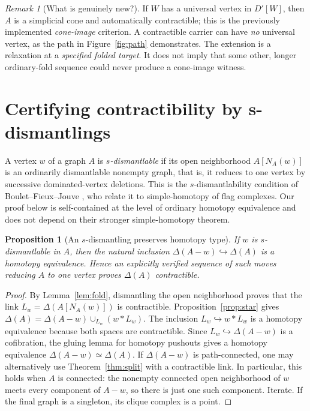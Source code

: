 \documentclass[11pt,letterpaper]{article}
\newtheorem{proposition}[theorem]{Proposition}
\theoremstyle{definition}
\theoremstyle{remark}
\newtheorem{remark}[theorem]{Remark}
\newcommand{\Del}{\Delta}
\newcommand{\N}{N}
\begin{document}
\begin{remark}[What is genuinely new?]\label{rem:notcone}
If \(W\) has a universal vertex in \(D'[W]\), then \(A\) is a simplicial cone and automatically contractible; this is the previously implemented \emph{cone-image} criterion. A contractible carrier can have \emph{no} universal vertex, as the path in Figure~\ref{fig:path} demonstrates. The extension is a relaxation at a \emph{specified folded target}. It does not imply that some other, longer ordinary-fold sequence could never produce a cone-image witness.
\end{remark}

\section{Certifying contractibility by s-dismantlings}
A vertex \(w\) of a graph \(A\) is \emph{\(s\)-dismantlable} if its open neighborhood \(A[\N_A(w)]\) is an ordinarily dismantlable nonempty graph, that is, it reduces to one vertex by successive dominated-vertex deletions. This is the \(s\)-dismantlability condition of Boulet--Fieux--Jouve \cite[Def.~1.1]{BouletFieuxJouve2010}, who relate it to simple-homotopy of flag complexes. Our proof below is self-contained at the level of ordinary homotopy equivalence and does not depend on their stronger simple-homotopy theorem.

\begin{proposition}[An \(s\)-dismantling preserves homotopy type]\label{prop:s}
If \(w\) is \(s\)-dismantlable in \(A\), then the natural inclusion \(\Del(A-w)\hookrightarrow\Del(A)\) is a homotopy equivalence. Hence an explicitly verified sequence of such moves reducing \(A\) to one vertex proves \(\Del(A)\) contractible.
\end{proposition}
\begin{proof}
By Lemma~\ref{lem:fold}, dismantling the open neighborhood proves that the link \(L_w=\Del(A[\N_A(w)])\) is contractible. Proposition~\ref{prop:star} gives \(\Del(A)=\Del(A-w)\cup_{L_w}(w*L_w)\). The inclusion \(L_w\hookrightarrow w*L_w\) is a homotopy equivalence because both spaces are contractible. Since \(L_w\hookrightarrow\Del(A-w)\) is a cofibration, the gluing lemma for homotopy pushouts gives a homotopy equivalence \(\Del(A-w)\simeq\Del(A)\). If \(\Del(A-w)\) is path-connected, one may alternatively use Theorem~\ref{thm:split} with a contractible link. In particular, this holds when \(A\) is connected: the nonempty connected open neighborhood of \(w\) meets every component of \(A-w\), so there is just one such component. Iterate. If the final graph is a singleton, its clique complex is a point.
\end{proof}
\end{document}
